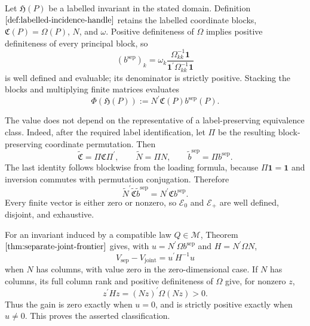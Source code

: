 Let \(\mathfrak H(P)\) be a labelled invariant in the stated domain. Definition \(\ref{def:labelled-incidence-handle}\) retains the labelled coordinate blocks, \(\mathfrak C(P)=\Omega(P)\), \(N\), and \(\omega\). Positive definiteness of \(\Omega\) implies positive definiteness of every principal block, so
\[
 (b^{\mathrm{sep}})_k
 =\omega_k\frac{\Omega_{kk}^{-1}\mathbf 1}
 {\mathbf 1^{\prime}\Omega_{kk}^{-1}\mathbf 1}
\]
is well defined and evaluable; its denominator is strictly positive. Stacking the blocks and multiplying finite matrices evaluates
\[
 \Phi(\mathfrak H(P))
 :=N^{\prime}\mathfrak C(P)b^{\mathrm{sep}}(P).
\]

The value does not depend on the representative of a label-preserving equivalence class. Indeed, after the required label identification, let \(\Pi\) be the resulting block-preserving coordinate permutation. Then
\[
 \widetilde{\mathfrak C}=\Pi\mathfrak C\Pi^{\prime},
 \qquad
 \widetilde N=\Pi N,
 \qquad
 \widetilde b^{\mathrm{sep}}=\Pi b^{\mathrm{sep}}.
\]
The last identity follows blockwise from the loading formula, because \(\Pi\mathbf 1=\mathbf 1\) and inversion commutes with permutation conjugation. Therefore
\[
 \widetilde N^{\prime}\widetilde{\mathfrak C}
 \widetilde b^{\mathrm{sep}}
 =N^{\prime}\mathfrak Cb^{\mathrm{sep}}.
\]
Every finite vector is either zero or nonzero, so \(\mathscr E_0\) and \(\mathscr E_+\) are well defined, disjoint, and exhaustive.

For an invariant induced by a compatible law \(Q\in\mathcal M\), Theorem \(\ref{thm:separate-joint-frontier}\) gives, with \(u=N^{\prime}\Omega b^{\mathrm{sep}}\) and \(H=N^{\prime}\Omega N\),
\[
 V_{\mathrm{sep}}-V_{\mathrm{joint}}=u^{\prime}H^{-1}u
\]
when \(N\) has columns, with value zero in the zero-dimensional case. If \(N\) has columns, its full column rank and positive definiteness of \(\Omega\) give, for nonzero \(z\),
\[
 z^{\prime}Hz=(Nz)^{\prime}\Omega(Nz)>0.
\]
Thus the gain is zero exactly when \(u=0\), and is strictly positive exactly when \(u\ne0\). This proves the asserted classification.

